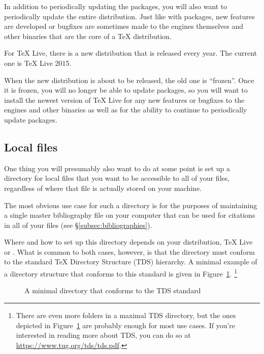 In addition to periodically updating the packages, you will also want to periodically update the entire distribution.
Just like with packages, new features are developed or bugfixes are sometimes made to the engines themselves and other binaries that are the core of a \TeX{} distribution.

For TeX Live, there is a new distribution that is released every year.
The current one is TeX Live 2015.

When the new distribution is about to be released, the old one is ``frozen''.
Once it is frozen, you will no longer be able to update packages, so you will want to install the newest version of TeX Live for any new features or bugfixes to the engines and other binaries as well as for the ability to continue to periodically update packages.

\subsection{Local files}
\label{subsec:local-files}

One thing you will presumably also want to do at some point is set up a directory for local files that you want to be accessible to all of your  files, regardless of where that  file is actually stored on your machine.

The most obvious use case for such a directory is for the purposes of maintaining a single master bibliography file on your computer that can be used for citations in all of your  files (see \S\ref{subsec:bibliographies}).

Where and how to set up this directory depends on your distribution, TeX Live or .
What is common to both cases, however, is that the directory must conform to the standard \TeX{} Directory Structure (TDS) hierarchy.
A minimal example of a directory structure that conforms to this standard is given in Figure~\ref{fig:TDS}.%
\footnote{%
\label{fn:TDS}
There are even more folders in a maximal TDS directory, but the ones depicted in Figure~\ref{fig:TDS} are probably enough for most use cases.
If you're interested in reading more about TDS, you can do so at \url{https://www.tug.org/tds/tds.pdf}.%
}

\begin{figure}[htbp]
	\centering
	\caption{A minimal directory that conforms to the TDS standard}
	\label{fig:TDS}
\end{figure}

